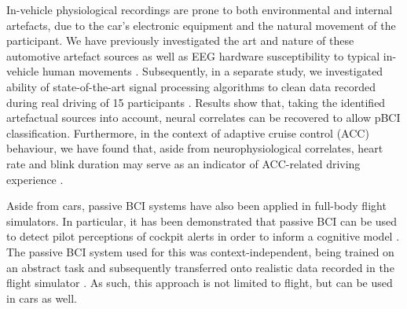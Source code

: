 \documentclass[a4paper]{article}
\begin{document}
In-vehicle physiological recordings are prone to both environmental and internal artefacts, due to the car's electronic equipment and the natural movement of the participant. We have previously investigated the art and nature of these automotive artefact sources as well as EEG hardware susceptibility to typical in-vehicle human movements \cite{zander2017dry}. Subsequently, in a separate study, we investigated ability of state-of-the-art signal processing algorithms to clean data recorded during real driving of 15 participants \cite{krol2017cleaning}. Results show that, taking the identified artefactual sources into account, neural correlates can be recovered to allow pBCI classification. Furthermore, in the context of adaptive cruise control (ACC) behaviour, we have found that, aside from neurophysiological correlates, heart rate and blink duration may serve as an indicator of ACC-related driving experience \cite{brouwer2017physdriving}.

Aside from cars, passive BCI systems have also been applied in full-body flight simulators. In particular, it has been demonstrated that passive BCI can be used to detect pilot perceptions of cockpit alerts in order to inform a cognitive model \cite{klaproth2020cognitivemodel}. The passive BCI system used for this was context-independent, being trained on an abstract task and subsequently transferred onto realistic data recorded in the flight simulator \cite{krol2022pilots}. As such, this approach is not limited to flight, but can be used in cars as well.










 

\end{document}
